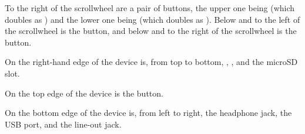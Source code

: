{{  To the right of the scrollwheel are a pair of buttons, the upper one being \ButtonPrev{} (which doubles as \ButtonRW{})
  and the lower one being \ButtonNext{} (which doubles as \ButtonFF{}). Below and to the left of the scrollwheel is the
  \ButtonMenu{} button, and below and to the right of the scrollwheel is the \ButtonBack{} button.


  On the right-hand edge of the device is, from top to bottom, \ButtonVolUp{}, \ButtonVolDown{}, and the microSD
  slot.

  On the top edge of the device is the \ButtonPower{} button.

  On the bottom edge of the device is, from left to right, the headphone jack, the USB port, and the line-out jack.
  }
}

